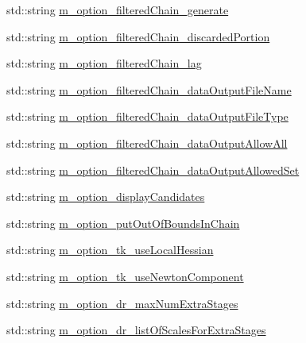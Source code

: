 \begin{DoxyCompactItemize}
std\-::string \hyperlink{class_q_u_e_s_o_1_1_metropolis_hastings_s_g_options_abb60803a2ba0d32816a1ac9ad67fe7fd}{m\-\_\-option\-\_\-filtered\-Chain\-\_\-generate}
\item 
std\-::string \hyperlink{class_q_u_e_s_o_1_1_metropolis_hastings_s_g_options_a6bc7417585b95eb59cedece39b5d5361}{m\-\_\-option\-\_\-filtered\-Chain\-\_\-discarded\-Portion}
\item 
std\-::string \hyperlink{class_q_u_e_s_o_1_1_metropolis_hastings_s_g_options_aa3e984a031cf626281bccd866e603865}{m\-\_\-option\-\_\-filtered\-Chain\-\_\-lag}
\item 
std\-::string \hyperlink{class_q_u_e_s_o_1_1_metropolis_hastings_s_g_options_a340a0e9c2b5c2bec86d143cb0f8d64f6}{m\-\_\-option\-\_\-filtered\-Chain\-\_\-data\-Output\-File\-Name}
\item 
std\-::string \hyperlink{class_q_u_e_s_o_1_1_metropolis_hastings_s_g_options_aca1e9af38b6ef1b83bf1fda6477404c4}{m\-\_\-option\-\_\-filtered\-Chain\-\_\-data\-Output\-File\-Type}
\item 
std\-::string \hyperlink{class_q_u_e_s_o_1_1_metropolis_hastings_s_g_options_a7317db52b0866c8895ad1a16d4a4b337}{m\-\_\-option\-\_\-filtered\-Chain\-\_\-data\-Output\-Allow\-All}
\item 
std\-::string \hyperlink{class_q_u_e_s_o_1_1_metropolis_hastings_s_g_options_a361df3110aea27f35465dedac372a90f}{m\-\_\-option\-\_\-filtered\-Chain\-\_\-data\-Output\-Allowed\-Set}
\item 
std\-::string \hyperlink{class_q_u_e_s_o_1_1_metropolis_hastings_s_g_options_a7881fafcf3caa7bf33d20ff0a7576944}{m\-\_\-option\-\_\-display\-Candidates}
\item 
std\-::string \hyperlink{class_q_u_e_s_o_1_1_metropolis_hastings_s_g_options_a6d1856b0435c6dfcac6b75ec36829b47}{m\-\_\-option\-\_\-put\-Out\-Of\-Bounds\-In\-Chain}
\item 
std\-::string \hyperlink{class_q_u_e_s_o_1_1_metropolis_hastings_s_g_options_a8b184b15ebded02f00668b1d0f761a2d}{m\-\_\-option\-\_\-tk\-\_\-use\-Local\-Hessian}
\item 
std\-::string \hyperlink{class_q_u_e_s_o_1_1_metropolis_hastings_s_g_options_af732a2bed220e834c03802de602025fa}{m\-\_\-option\-\_\-tk\-\_\-use\-Newton\-Component}
\item 
std\-::string \hyperlink{class_q_u_e_s_o_1_1_metropolis_hastings_s_g_options_a8975cf2f3431edb501ccc94f0c65b2c3}{m\-\_\-option\-\_\-dr\-\_\-max\-Num\-Extra\-Stages}
\item 
std\-::string \hyperlink{class_q_u_e_s_o_1_1_metropolis_hastings_s_g_options_a23025b02dde1763feed23f53a6549ac0}{m\-\_\-option\-\_\-dr\-\_\-list\-Of\-Scales\-For\-Extra\-Stages}

\end{DoxyCompactItemize}
